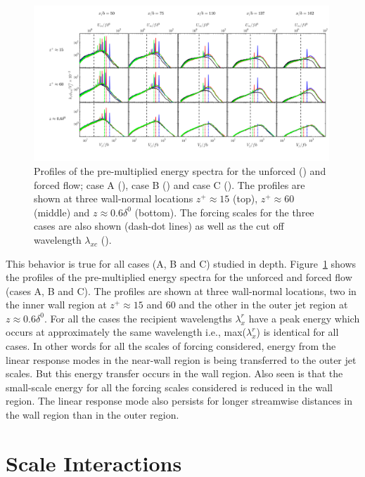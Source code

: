 \begin{figure}
	\centering
	\includegraphics[width=0.99\textwidth]{pics/specLineAll.png}
	\caption{Profiles of the pre-multiplied energy spectra for the unforced (\full) and forced flow; case A (\textcolor{blue}{\full}), case B (\textcolor{red}{\full}) and case C (\textcolor{green}{\full}). The profiles are shown at three wall-normal locations $z^+\approx 15$ (top), $z^+\approx 60$ (middle) and $z\approx 0.6 \delta^0$ (bottom). The forcing scales for the three cases are also shown (dash-dot lines) as well as the cut off wavelength $\lambda_{xc}$ (\dashed).}
	\label{fg:specLnAll}
\end{figure}

This behavior is true for all cases (A, B and C) studied in depth. Figure~\ref{fg:specLnAll} shows the profiles of the pre-multiplied energy spectra for the unforced and forced flow (cases A, B and C). The profiles are shown at three wall-normal locations, two in the inner wall region at $z^+\approx 15$ and 60 and the other in the outer jet region at $z\approx 0.6 \delta^0$. For all the cases the recipient wavelengths $\lambda_x^r$ have a peak energy which occurs at approximately the same wavelength i.e., max($\lambda_x^r$) is identical for all cases. In other words for all the scales of forcing considered, energy from the linear response modes in the near-wall region is being transferred to the outer jet scales. But this energy transfer occurs in the wall region. Also seen is that the small-scale energy for all the forcing scales considered is reduced in the wall region. The linear response mode also persists for longer streamwise distances in the wall region than in the outer region.

\clearpage

\section{Scale Interactions}

